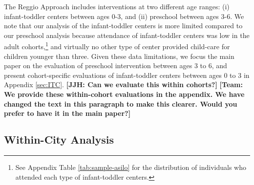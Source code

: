 The Reggio Approach includes interventions at two different age ranges: (i) infant-toddler centers between ages 0-3, and (ii) preschool between ages 3-6. We note that our analysis of the infant-toddler centers is more limited compared to our preschool analysis because attendance of infant-toddler centers was low in the adult cohorts,\footnote{See Appendix Table \ref{tab:sample-asilo} for the distribution of individuals who attended each type of infant-toddler centers.} and virtually no other type of center provided child-care for children younger than three. Given these data limitations, we focus the main paper on the evaluation of preschool intervention between ages 3 to 6, and present cohort-specific evaluations of  infant-toddler centers between ages 0 to 3 in Appendix \ref{sec:ITC}. \textbf{[JJH: Can we evaluate this within cohorts?]} \textbf{[Team: We provide these within-cohort evaluations in the appendix. We have changed the text in this paragraph to make this clearer. Would you prefer to have it in the main paper?]}


\subsection{Within-City Analysis} \label{sec:within-city-analysis}
